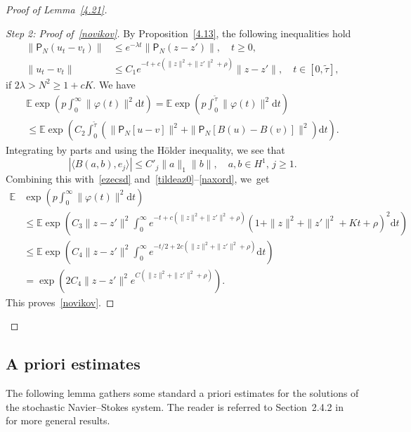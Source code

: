 \documentclass[10pt]{amsart}
\theoremstyle{definition}\newtheorem{defi}[theo]{Definition}\newtheorem{rema}[theo]{Remark}\newtheorem{exam}[theo]{Example}\newtheorem{exem}[theo]{Example}\newtheorem{nota}[theo]{Notation}
\newcommand{\ph}{\varphi}
\newcommand{\E}{{\mathbb E}}
\newcommand{\la}{\lambda}
\newcommand{\pp}{{{\mathsf P}_N}}
\newcommand{\lag}{\langle}
\newcommand{\rag}{\rangle}
\newcommand{\dd}{\mathrm{d}}
\newenvironment{proofc}[1][\proofname]{\begin{proof}[{#1}]}{\end{proof}}
\begin{document}
\begin{proofc}[Proof of Lemma~\ref{4.21}]
\begin{proof}[Step 2: Proof of~\eqref{novikov}]
By Proposition~\ref{4.13}, the following inequalities hold
\begin{align}
\|\pp(u_t-v_t)\| &\le e^{- \lambda t}\|\pp(z-z') \|, \quad t\ge0,\label{tildeaz0}
\\
\|u_t-v_t \|&\leq C_{1} e^{- t+c (\|z\|^2+\|z'\|^2+ \rho)}\|z-z'\|, \quad t\in [0,\tilde \tau],\label{tildeaz}
\end{align}
if $2\la>N^2\ge1+cK$. We have
\begin{multline}\label{naxord}
\E\exp\left(p\int_0^\infty \|\ph (t)\|^2\dd t\right) =\E\exp\left(p\int_0^{\tilde\tau} \|\ph(t)\|^2\dd t\right)\\
\leq\E\exp\left(C_2\int_0^{\tilde\tau}\left(\| {\mathsf P}_N[u-v]\|^2+\| {\mathsf P}_N[B(u)-B(v)]\|^2\right)\dd t\right).
\end{multline}
Integrating by parts and using the H\"older inequality, we see that
\[
|\lag B(a,b), e_j\rag| \le C'_j\|a\|_1 \|b\|, \quad a,b\in H^1, \, j\ge1.
\]
Combining this with~\eqref{ezecsd} and~\eqref{tildeaz0}--\eqref{naxord}, we~get
\begin{align*}
\E&\exp\left(p\int_0^\infty \|\ph (t)\|^2\dd t\right)\\
&\leq\E\exp\left(C_3\|z-z'\|^2\int_0^\infty e^{- t+c (\|z\|^2+\|z'\|^2+ \rho)}(1+\|z\|^2+\|z'\|^2+Kt+\rho)^2\dd t\right)\\&\le\E\exp\left(C_4\|z-z'\|^2\int_0^\infty e^{- t/2+2c (\|z\|^2+\|z'\|^2+ \rho)} \dd t\right)\\&=\exp\left(2C_{4}\|z-z'\|^2 e^{C(\|z\|^2+\|z'\|^2+\rho)} \right).
\end{align*}
This proves~\eqref{novikov}.
\end{proof}
\let\qed\relax
\end{proofc}

\subsection{A priori estimates}\label{S:5.1}

The following lemma gathers some standard a priori estimates for the solutions of the stochastic Navier--Stokes system. The reader is referred to Section~2.4.2 in~\cite{KS-book} for more general results.
\end{document}
